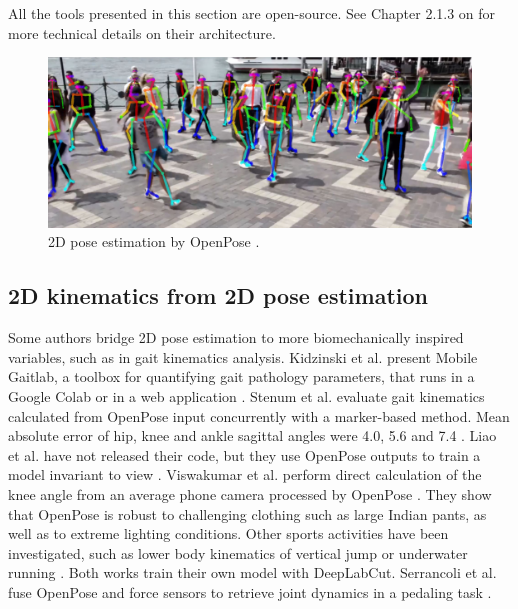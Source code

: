 All the tools presented in this section are open-source. See Chapter 2.1.3 on  for more technical details on their architecture.

\begin{figure}[hbtp]
	\centering
	\def\svgwidth{1\columnwidth}
	\fontsize{10pt}{10pt}\selectfont
	\includegraphics[width=0.9\linewidth]{"../Chap1/Figures/Fig_OpenPose.JPG"}
	\caption{2D pose estimation by OpenPose \cite{Cao2019}.}
	\label{fig_openpose}
\end{figure}


\subsection{2D kinematics from 2D pose estimation}

Some authors bridge 2D pose estimation to more biomechanically inspired variables, such as in gait kinematics analysis. Kidzinski et al. present Mobile Gaitlab, a toolbox for quantifying gait pathology parameters, that runs in a Google Colab or in a web application \cite{Kidziński2020}. Stenum et al. evaluate gait kinematics calculated from OpenPose input concurrently with a marker-based method. Mean absolute error of hip, knee and ankle sagittal angles were 4.0\degree{}, 5.6\degree{} and 7.4\degree{} \cite{Stenum2021}. Liao et al. have not released their code, but they use OpenPose outputs to train a model invariant to view \cite{Liao2020}. Viswakumar et al. perform direct calculation of the knee angle from an average phone camera processed by OpenPose \cite{Viswakumar2019}. They show that OpenPose is robust to challenging clothing such as large Indian pants, as well as to extreme lighting conditions. Other sports activities have been investigated, such as lower body kinematics of vertical jump \cite{Drazan2021} or underwater running \cite{Cronin2019}. Both works train their own model with DeepLabCut. Serrancoli et al. fuse OpenPose and force sensors to retrieve joint dynamics in a pedaling task \cite{Serrancolí2020}. 

